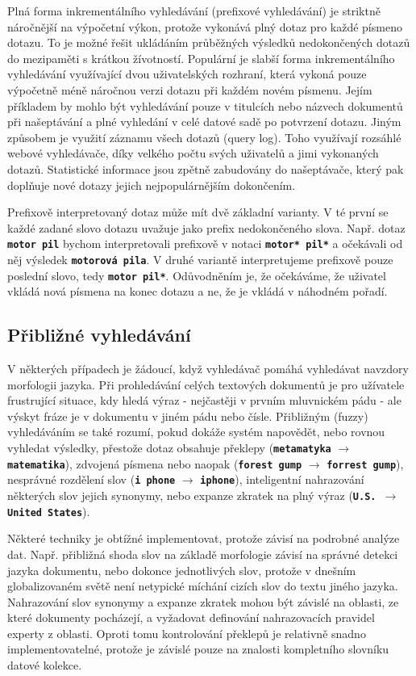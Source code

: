\documentclass[11pt,letterpaper,oneside,openright]{book}
\newcommand{\bftt}[1]{\texttt{\textbf{#1}}}
\begin{document}
Plná forma inkrementálního vyhledávání (prefixové vyhledávání) je striktně
náročnější na výpočetní výkon, protože vykonává plný dotaz pro každé písmeno
dotazu. To je možné řešit ukládáním průběžných výsledků nedokončených dotazů do
mezipaměti s krátkou žívotností.  Populární je slabší forma inkrementálního
vyhledávání využívající dvou uživatelských rozhraní, která vykoná pouze
výpočetně méně náročnou verzi dotazu při každém novém písmenu.  Jejím příkladem
by mohlo být vyhledávání pouze v titulcích nebo názvech dokumentů při
našeptávání a plné vyhledání v celé datové sadě po potvrzení dotazu.  Jiným
způsobem je využití záznamu všech dotazů (query log). Toho využívají rozsáhlé
webové vyhledávače, díky velkého počtu svých uživatelů a jimi vykonaných
dotazů. Statistické informace jsou zpětně zabudovány do našeptávače, který pak
doplňuje nové dotazy jejich nejpopulárnějším dokončením.

Prefixově interpretovaný dotaz může mít dvě základní varianty. V té první se
každé zadané slovo dotazu uvažuje jako prefix nedokončeného slova. Např. dotaz
\bftt{motor pil} bychom interpretovali prefixově v notaci \bftt{motor* pil*} a
očekávali od něj výsledek \bftt{motorová pila}. V druhé variantě interpretujeme
prefixově pouze poslední slovo, tedy \bftt{motor pil*}. Odůvodněním je, že
očekáváme, že uživatel vkládá nová písmena na konec dotazu a ne, že je vkládá
v náhodném pořadí.

\subsection{Přibližné vyhledávání}
V některých případech je žádoucí, když vyhledávač pomáhá vyhledávat navzdory
morfologii jazyka. Při prohledávání celých textových dokumentů je pro užívatele
frustrující situace, kdy hledá výraz - nejčastěji v prvním mluvnickém pádu -
ale výskyt fráze je v dokumentu v jiném pádu nebo čísle. Přibližným (fuzzy)
vyhledáváním se také rozumí, pokud dokáže systém napovědět, nebo rovnou
vyhledat výsledky, přestože dotaz obsahuje překlepy (\bftt{metamatyka}
$\rightarrow$ \bftt{matematika}), zdvojená písmena nebo naopak (\bftt{forest
gump}  $\rightarrow$ \bftt{forrest gump}), nesprávné rozdělení slov (\bftt{i
phone}  $\rightarrow$ \bftt{iphone}), inteligentní nahrazování některých slov
jejich synonymy, nebo expanze zkratek na plný výraz (\bftt{U.S.  $\rightarrow$
United States}).

Některé techniky je obtížné implementovat, protože závisí na podrobné analýze
dat. Např. přibližná shoda slov na základě morfologie závisí na správné detekci
jazyka dokumentu, nebo dokonce jednotlivých slov, protože v dnešním
globalizovaném světě není netypické míchání cizích slov do textu jiného jazyka.
Nahrazování slov synonymy a expanze zkratek mohou být závislé na oblasti, ze
které dokumenty pocházejí, a vyžadovat definování nahrazovacích pravidel
experty z oblasti. Oproti tomu kontrolování překlepů je relativně snadno
implementovatelné, protože je závislé pouze na znalosti kompletního slovníku
datové kolekce.
\end{document}
